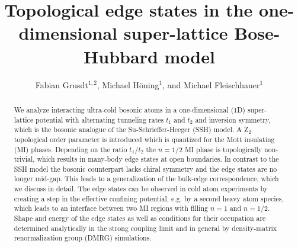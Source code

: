 \documentclass[pra,aps,twocolumn,showpacs]{revtex4}
\begin{document}
 
\newcommand{\nn}{{\mathbbm{N}}}
\newcommand{\rr}{{\mathbbm{R}}}
\newcommand{\cc}{{\mathbbm{C}}}
\newcommand{\id}{{\sf 1 \hspace{-0.3ex} \rule{0.1ex}{1.52ex}\rule[-.01ex]{0.3ex}{0.1ex}}}
\newcommand{\me}{\mathrm{e}}
\newcommand{\mi}{\mathrm{i}}
\newcommand{\md}{\mathrm{d}}
\renewcommand{\vec}[1]{\text{\boldmath$#1$}}

\newcommand{\Zak}{\text{Zak}}
\newcommand{\cmnt}[2]{{\color{blue} #1} {\color{red} \footnotesize \emph{\texttt{#2}}}}
\newcommand{\Cmnt}[1]{{\color{ForestGreen}#1}}
\newcommand{\cmntMH}[2]{{\color{RoyalBlue} #1}{\color{Red} \footnotesize \emph{\texttt{#2}}}}

\title{Topological edge states in the one-dimensional super-lattice Bose-Hubbard model}
\author{Fabian Grusdt$^{1,2}$, Michael H\"oning$^{1}$, and Michael Fleischhauer$^{1}$}
 
\begin{abstract} 
We analyze interacting ultra-cold bosonic atoms in a one-dimensional (1D)
super-lattice potential with alternating tunneling rates $t_1$ and $t_2$ and inversion symmetry, which is the bosonic analogue of the Su-Schrieffer-Heeger (SSH) model. 
A Z$_2$ topological
order parameter is introduced which is quantized for the Mott insulating
(MI) phases. Depending on the ratio $t_1/t_2$ the
$n=1/2$ MI phase is topologically non-trivial, which results in many-body edge states at open boundaries. In contrast to the SSH model
the bosonic counterpart lacks chiral symmetry and the edge states are no longer mid-gap.
This leads to a generalization of the bulk-edge correspondence, which we discuss in detail. The edge states can be observed in cold atom experiments by creating a step in the effective confining 
potential, e.g. by a second heavy atom species, which leads to an interface between two MI regions with filling $n=1$ and $n=1/2$. 
Shape and energy of the edge states as well as
conditions for their occupation are determined analytically in the strong coupling limit and 
in general by density-matrix renormalization group (DMRG) simulations.
\end{abstract}
 
\end{document}
